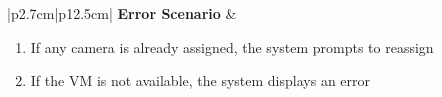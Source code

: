 \begin{table}[H]
\begin{tabular}{|p{2.7cm}|p{12.5cm}|}
        \hline
        \textbf{Error Scenario} & \begin{minipage}[t]{\linewidth}
                                      \begin{enumerate}[topsep=0pt,itemsep=1pt,parsep=0pt,partopsep=0pt]
                                          \item If any camera is already assigned, the system prompts to reassign
                                          \item If the VM is not available, the system displays an error
                                      \end{enumerate}
                                  \end{minipage}               \\
        \hline
    \end{tabular}
    \label{tab:admin-bulk-assign-cameras}
\end{table}

